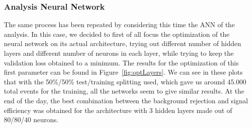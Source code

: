 \documentclass[a4paper, 10pt, openright]{report}
\begin{document}
\begin{appendices}
\subsubsection{Analysis Neural Network}

The same process has been repeated by considering this time the \ac{ANN} of the analysis. In this case, we decided to first of all focus the optimization of the neural network on its actual architecture, trying out different number of hidden layers and different number of neurons in each layer, while trying to keep the validation loss obtained to a minimum. The results for the optimization of this first parameter can be found in Figure~\ref{fig:optLayers}. We can see in these plots that with the 50\%/50\% test/training splitting used, which gave us around 45.000 total events for the training, all the networks seem to give similar results. At the end of the day, the best combination between the background rejection and signal efficiency was obtained for the architecture with 3 hidden layers made out of 80/80/40 neurons.



\end{appendices}
\end{document}
